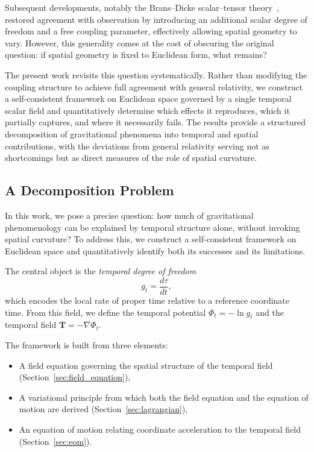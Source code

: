 \documentclass[12pt]{article}
\begin{document}
Subsequent developments, notably the Brans--Dicke scalar--tensor theory~\cite{Brans1961}, restored agreement with observation by introducing an additional scalar degree of freedom and a free coupling parameter, effectively allowing spatial geometry to vary. However, this generality comes at the cost of obscuring the original question: if spatial geometry is fixed to Euclidean form, what remains?

The present work revisits this question systematically. Rather than modifying the coupling structure to achieve full agreement with general relativity, we construct a self-consistent framework on Euclidean space governed by a single temporal scalar field and quantitatively determine which effects it reproduces, which it partially captures, and where it necessarily fails. The results provide a structured decomposition of gravitational phenomena into temporal and spatial contributions, with the deviations from general relativity serving not as shortcomings but as direct measures of the role of spatial curvature.

\subsection{A Decomposition Problem}

In this work, we pose a precise question: how much of gravitational phenomenology can be explained by temporal structure alone, without invoking spatial curvature? To address this, we construct a self-consistent framework on Euclidean space and quantitatively identify both its successes and its limitations.

The central object is the \emph{temporal degree of freedom}
$$
g_t = \frac{d\tau}{dt} ,
$$
which encodes the local rate of proper time relative to a reference coordinate time. From this field, we define the temporal potential $\Phi_t = -\ln g_t$ and the temporal field $\mathbf{T} = -\nabla \Phi_t$.

The framework is built from three elements:
\begin{itemize}
\item A field equation governing the spatial structure of the temporal field (Section~\ref{sec:field_equation}),
\item A variational principle from which both the field equation and the equation of motion are derived (Section~\ref{sec:lagrangian}),
\item An equation of motion relating coordinate acceleration to the temporal field (Section~\ref{sec:eom}).
\end{itemize}
\end{document}
